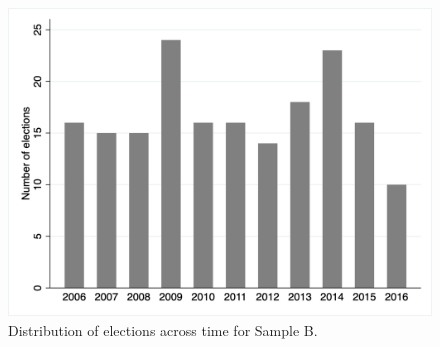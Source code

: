 \documentclass[12pt,a4paper]{article}
\begin{document}
\begin{figure}[h!]
	\centering
	\includegraphics[scale=0.4]{../output/plots/elec_freq2.png}
	\caption{Distribution of elections across time for Sample B.}
	\label{bar2}
\end{figure}

\clearpage
\end{document}
